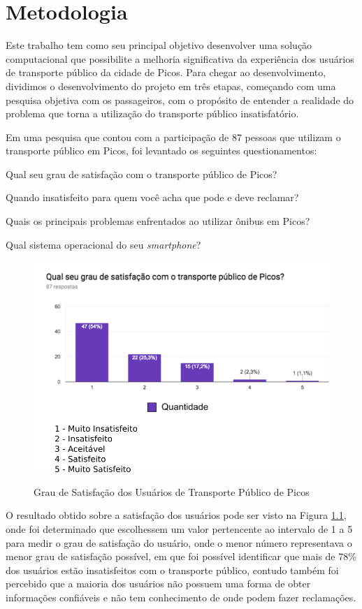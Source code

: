\chapter{Metodologia}\label{cap:metodologia}

Este trabalho tem como seu principal objetivo desenvolver uma solução computacional que possibilite a melhoria significativa da experiência dos usuários de transporte público da cidade de Picos. Para chegar ao desenvolvimento, dividimos o desenvolvimento do projeto em três etapas, começando com uma pesquisa objetiva com os passageiros, com o propósito de entender a realidade do problema que torna a utilização do transporte público insatisfatório.

Em uma pesquisa que contou com a participação de 87 pessoas que utilizam o transporte público em Picos, foi levantado os seguintes questionamentos:

\begin{lista}
\item Qual seu grau de satisfação com o transporte público de Picos?
\item Quando insatisfeito para quem você acha que pode e deve reclamar?
\item Quais os principais problemas enfrentados ao utilizar ônibus em Picos?
\item Qual sistema operacional do seu \textit{smartphone}?
\end{lista}

\begin{figure}[H]
\caption{Grau de Satisfação dos Usuários de Transporte Público de Picos}
\centering
\includegraphics[width=.8\textwidth]{imagens/satisfacao.png}
\label{fig:satisfacao}
\end{figure}

O resultado obtido sobre a satisfação dos usuários pode ser visto na Figura \ref{fig:satisfacao}, onde foi determinado que escolhessem um valor pertencente ao intervalo de 1 a 5 para medir o grau de satisfação do usuário, onde o menor número representava o menor grau de satisfação possível, em que foi possível identificar que mais de 78\% dos usuários estão insatisfeitos com o transporte público, contudo também foi percebido que a maioria dos usuários não possuem uma forma de obter informações confiáveis e não tem conhecimento de onde podem fazer reclamações.

